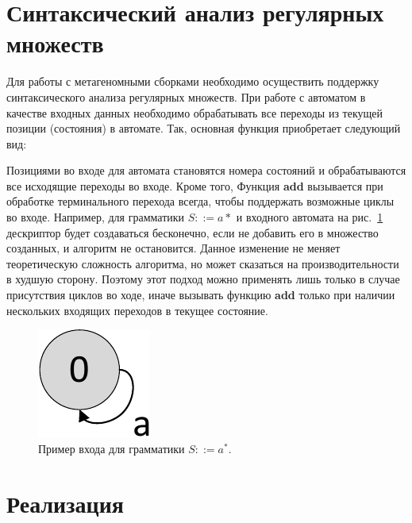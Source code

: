 \documentclass[14pt]{matmex-diploma-custom}
\begin{document}
	
	
	
	
	
	
    
    
    \section{Синтаксический анализ регулярных множеств}
    Для работы с метагеномными сборками необходимо осуществить поддержку синтаксического анализа регулярных множеств.
    При работе с автоматом в качестве входных данных необходимо обрабатывать все переходы из текущей позиции (состояния) в автомате.
    Так, основная функция приобретает следующий вид:
    
    Позициями во входе для автомата становятся номера состояний и обрабатываются все исходящие переходы во входе. Кроме того,    
    Функция \textbf{add} вызывается при обработке терминального перехода всегда, чтобы поддержать возможные циклы во входе.
    Например, для грамматики $S ::= a*$ и входного автомата на рис.~\ref{graphEx}
    дескриптор будет создаваться бесконечно, если не добавить его в множество созданных, и алгоритм не остановится.
    Данное изменение не меняет теоретическую сложность алгоритма, но может сказаться на производительности в худшую сторону.
    Поэтому этот подход можно применять лишь только в случае присутствия циклов во ходе, иначе вызывать функцию \textbf{add}
    только при наличии нескольких входящих переходов в текущее состояние.
    
    \begin{figure}[ht]   
        \centering
        \includegraphics[scale=.5]{pictures/graphEx.pdf}
        \caption{Пример входа для грамматики $S ::= a^*$.}
        \label{graphEx}
    \end{figure}

    \section{Реализация}
    
\end{document}
